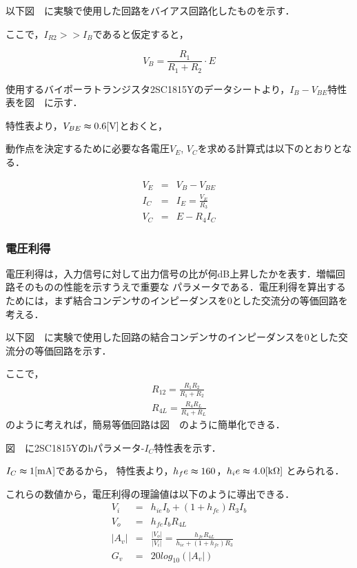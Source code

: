 \documentclass[dvipdfmx,titlepage,a4j]{jsarticle}  %
\begin{document}
以下図　に実験で使用した回路をバイアス回路化したものを示す．

ここで，$I_{R2} >> I_B$であると仮定すると，

\begin{equation}
  V_B = \frac{R_1}{R_1 + R_2} \cdot E 
\end{equation}

使用するバイポーラトランジスタ2SC1815Yのデータシートより，$I_B - V_{BE}$特性表を図　に示す．

特性表より，$V_{BE}\thickapprox 0.6 \mathrm{[V]}$とおくと，

動作点を決定するために必要な各電圧$V_{E}$, $V_{C}$を求める計算式は以下のとおりとなる．

\begin{eqnarray}
  V_E &=& V_B - V_{BE} \\
  I_C &=& I_E = \frac{V_E}{R_3} \\
  V_C &=& E - R_4 I_C
\end{eqnarray}

\subsubsection{電圧利得}
電圧利得は，入力信号に対して出力信号の比が何dB上昇したかを表す．増幅回路そのものの性能を示すうえで重要な
パラメータである．電圧利得を算出するためには，まず結合コンデンサのインピーダンスを0とした交流分の等価回路を考える．

以下図　に実験で使用した回路の結合コンデンサのインピーダンスを0とした交流分の等価回路を示す．

ここで，
\begin{eqnarray}
  R_{12} = \frac{R_1 R_2}{R_1 + R_2} \\
  R_{4L} = \frac{R_4 R_L}{R_4 + R_L}
\end{eqnarray}
のように考えれば，簡易等価回路は図　のように簡単化できる．

図　に2SC1815Yのhパラメータ-$I_C$特性表を示す．

$I_C \thickapprox 1 \mathrm{[mA]}$であるから，
特性表より，$h_fe \thickapprox 160$，$h_ie \thickapprox 4.0 \mathrm{[k \Omega]}$
とみられる．

これらの数値から，電圧利得の理論値は以下のように導出できる．
\begin{eqnarray}
  V_i &=& h_{ie} I_b + (1+h_{fe})R_3 I_b \\
  V_o &=& h_{fe} I_b R_{4L} \\
  \left\lvert A_v \right\rvert &=& \frac{\left\lvert V_o \right\rvert}{\left\lvert V_i \right\rvert} 
  = \frac{h_{fe} R_{4L}}{h_{ie} + (1+h_{fe})R_3} \\
  G_v &=& 20log_{10}(\left\lvert A_v \right\rvert)
\end{eqnarray}
\end{document}
